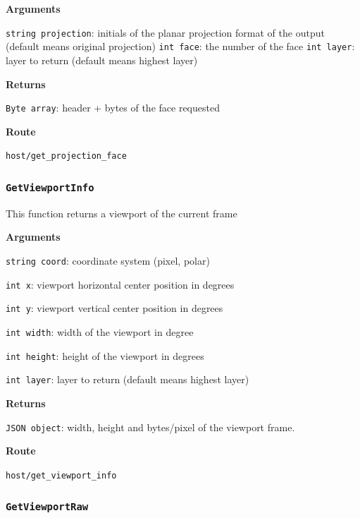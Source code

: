 \documentclass{article}
\begin{document}
\textbf{Arguments}

\texttt{string projection}: initials of the planar projection format of the output (default means original projection)
\texttt{int face}: the number of the face
\texttt{int layer}: layer to return (default means highest layer)

\textbf{Returns}

\texttt{Byte array}:  header + bytes of the face requested

\textbf{Route}

\texttt{host/get_projection_face}


\subsubsection*{\texttt{GetViewportInfo}}

This function returns a viewport of the current frame

\textbf{Arguments}

\texttt{string coord}: coordinate system (pixel, polar)

\texttt{int x}: viewport horizontal center position in degrees

\texttt{int y}: viewport vertical center position in degrees

\texttt{int width}: width of the viewport in degree

\texttt{int height}: height of the viewport in degrees

\texttt{int layer}: layer to return (default means highest layer)

\textbf{Returns}

\texttt{JSON object}: width, height and bytes/pixel of the viewport frame.

\textbf{Route}

\texttt{host/get_viewport_info}


\subsubsection*{\texttt{GetViewportRaw}}
\end{document}
